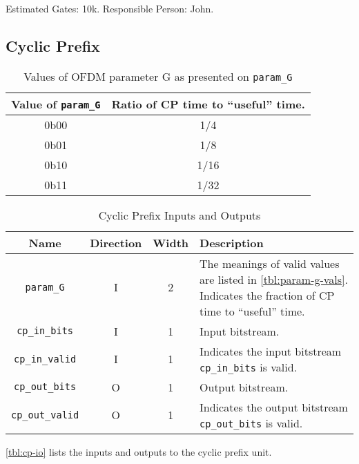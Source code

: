 \documentclass[dvips,10pt,twocolumn]{article}
\begin{document}
	Estimated Gates: 10k.
	Responsible Person: John.

	\subsection{Cyclic Prefix}
	\label{sec:cyclic_prefix}

	\begin{table}
	\begin{tabulary}{0.5\textwidth}{C|C}
		\label{tbl:param-g-vals}
		Value of \texttt{param\_G} & Ratio of CP time to
		``useful'' time. \\ \hline

		0b00 & 1/4 \\
		0b01 & 1/8 \\
		0b10 & 1/16 \\
		0b11 & 1/32 \\

	\end{tabulary}
	\caption{Values of OFDM parameter G as presented on
	\texttt{param\_G}}
	\end{table}

	\begin{table*}
	\begin{tabularx}{\textwidth}{c|c|c|X}
		\label{tbl:cp-io}
		Name & Direction & Width & Description \\ \hline

		\texttt{param\_G} & I & 2 & The meanings of valid values
		are listed in \autoref{tbl:param-g-vals}. Indicates the
		fraction of CP time to ``useful'' time.
		\\

		\texttt{cp\_in\_bits} & I & 1 & Input bitstream. \\
		
		\texttt{cp\_in\_valid} & I & 1 & Indicates the input
		bitstream \texttt{cp\_in\_bits} is valid. \\

		\texttt{cp\_out\_bits} & O & 1 & Output bitstream. \\

		\texttt{cp\_out\_valid} & O & 1 & Indicates the output
		bitstream \texttt{cp\_out\_bits} is valid. \\

	\end{tabularx}
	\caption{Cyclic Prefix Inputs and Outputs}
	\end{table*}

	\autoref{tbl:cp-io} lists the inputs and outputs to the cyclic
	prefix unit.
\end{document}
